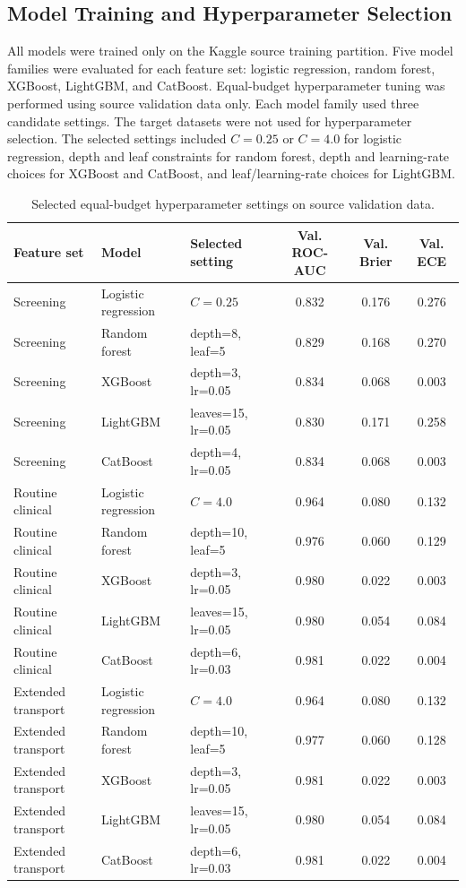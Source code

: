 \documentclass{ieeeaccess}
\begin{document}
\subsection{Model Training and Hyperparameter Selection}
All models were trained only on the Kaggle source training partition. Five model families were evaluated for each feature set: logistic regression, random forest, XGBoost, LightGBM, and CatBoost. Equal-budget hyperparameter tuning was performed using source validation data only. Each model family used three candidate settings. The target datasets were not used for hyperparameter selection. The selected settings included $C=0.25$ or $C=4.0$ for logistic regression, depth and leaf constraints for random forest, depth and learning-rate choices for XGBoost and CatBoost, and leaf/learning-rate choices for LightGBM.

\begin{table}[!t]
\centering
\caption{Selected equal-budget hyperparameter settings on source validation data.}
\label{tab:tuning}
\scriptsize
\begin{tabular}{lllccc}
\toprule
Feature set & Model & Selected setting & Val. ROC-AUC & Val. Brier & Val. ECE \\
\midrule
Screening & Logistic regression & $C=0.25$ & 0.832 & 0.176 & 0.276 \\
Screening & Random forest & depth=8, leaf=5 & 0.829 & 0.168 & 0.270 \\
Screening & XGBoost & depth=3, lr=0.05 & 0.834 & 0.068 & 0.003 \\
Screening & LightGBM & leaves=15, lr=0.05 & 0.830 & 0.171 & 0.258 \\
Screening & CatBoost & depth=4, lr=0.05 & 0.834 & 0.068 & 0.003 \\
Routine clinical & Logistic regression & $C=4.0$ & 0.964 & 0.080 & 0.132 \\
Routine clinical & Random forest & depth=10, leaf=5 & 0.976 & 0.060 & 0.129 \\
Routine clinical & XGBoost & depth=3, lr=0.05 & 0.980 & 0.022 & 0.003 \\
Routine clinical & LightGBM & leaves=15, lr=0.05 & 0.980 & 0.054 & 0.084 \\
Routine clinical & CatBoost & depth=6, lr=0.03 & 0.981 & 0.022 & 0.004 \\
Extended transport & Logistic regression & $C=4.0$ & 0.964 & 0.080 & 0.132 \\
Extended transport & Random forest & depth=10, leaf=5 & 0.977 & 0.060 & 0.128 \\
Extended transport & XGBoost & depth=3, lr=0.05 & 0.981 & 0.022 & 0.003 \\
Extended transport & LightGBM & leaves=15, lr=0.05 & 0.980 & 0.054 & 0.084 \\
Extended transport & CatBoost & depth=6, lr=0.03 & 0.981 & 0.022 & 0.004 \\
\bottomrule
\end{tabular}
\end{table}
\end{document}
